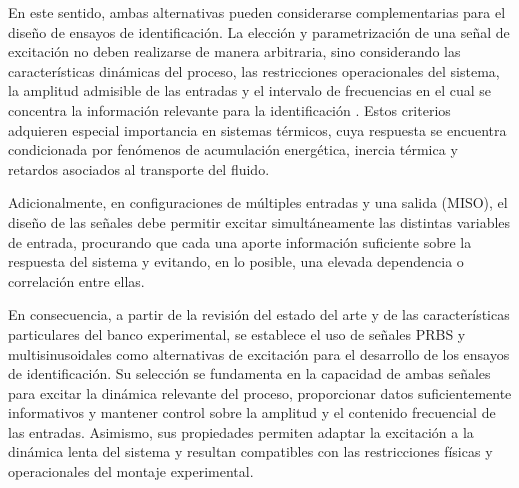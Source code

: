 \documentclass[11pt]{report}
\begin{document}
En este sentido, ambas alternativas pueden considerarse complementarias para el diseño de ensayos de identificación. La elección y parametrización de una señal de excitación no deben realizarse de manera arbitraria, sino considerando las características dinámicas del proceso, las restricciones operacionales del sistema, la amplitud admisible de las entradas y el intervalo de frecuencias en el cual se concentra la información relevante para la identificación \cite{ljung1999system}. Estos criterios adquieren especial importancia en sistemas térmicos, cuya respuesta se encuentra condicionada por fenómenos de acumulación energética, inercia térmica y retardos asociados al transporte del fluido.

Adicionalmente, en configuraciones de múltiples entradas y una salida (MISO), el diseño de las señales debe permitir excitar simultáneamente las distintas variables de entrada, procurando que cada una aporte información suficiente sobre la respuesta del sistema y evitando, en lo posible, una elevada dependencia o correlación entre ellas.

En consecuencia, a partir de la revisión del estado del arte y de las características particulares del banco experimental, se establece el uso de señales PRBS y multisinusoidales como alternativas de excitación para el desarrollo de los ensayos de identificación. Su selección se fundamenta en la capacidad de ambas señales para excitar la dinámica relevante del proceso, proporcionar datos suficientemente informativos y mantener control sobre la amplitud y el contenido frecuencial de las entradas. Asimismo, sus propiedades permiten adaptar la excitación a la dinámica lenta del sistema y resultan compatibles con las restricciones físicas y operacionales del montaje experimental.

\end{document}
